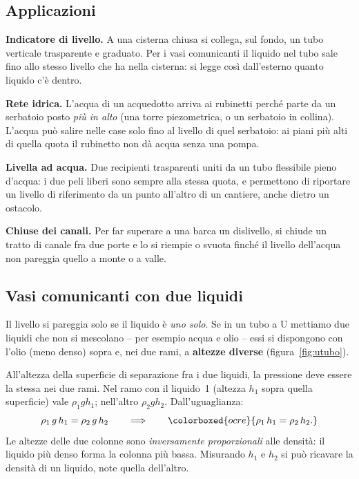 \subsection{Applicazioni}
\begin{elenco}
    \item \textbf{Indicatore di livello.} A una cisterna chiusa si collega, sul fondo, un tubo verticale trasparente e graduato. Per i vasi comunicanti il liquido nel tubo sale fino allo stesso livello che ha nella cisterna: si legge così dall'esterno quanto liquido c'è dentro.
    \item \textbf{Rete idrica.} L'acqua di un acquedotto arriva ai rubinetti perché parte da un serbatoio posto \emph{più in alto} (una torre piezometrica, o un serbatoio in collina). L'acqua può salire nelle case solo fino al livello di quel serbatoio: ai piani più alti di quella quota il rubinetto non dà acqua senza una pompa.
    \item \textbf{Livella ad acqua.} Due recipienti trasparenti uniti da un tubo flessibile pieno d'acqua: i due peli liberi sono sempre alla stessa quota, e permettono di riportare un livello di riferimento da un punto all'altro di un cantiere, anche dietro un ostacolo.
    \item \textbf{Chiuse dei canali.} Per far superare a una barca un dislivello, si chiude un tratto di canale fra due porte e lo si riempie o svuota finché il livello dell'acqua non pareggia quello a monte o a valle.
\end{elenco}

\subsection{Vasi comunicanti con due liquidi}
Il livello si pareggia solo se il liquido è \emph{uno solo}. Se in un tubo a U mettiamo due liquidi che non si mescolano -- per esempio acqua e olio -- essi si dispongono con l'olio (meno denso) sopra e, nei due rami, a \textbf{altezze diverse} (figura~\ref{fig:utubo}).

All'altezza della superficie di separazione fra i due liquidi, la pressione deve essere la stessa nei due rami. Nel ramo con il liquido~1 (altezza $h_1$ sopra quella superficie) vale $\rho_1 g h_1$; nell'altro $\rho_2 g h_2$. Dall'uguaglianza:
\[ \rho_1\,g\,h_1 = \rho_2\,g\,h_2 \qquad\Longrightarrow\qquad \colorboxed{ocre}{ \rho_1\,h_1 = \rho_2\,h_2. } \]
Le altezze delle due colonne sono \emph{inversamente proporzionali} alle densità: il liquido più denso forma la colonna più bassa. Misurando $h_1$ e $h_2$ si può ricavare la densità di un liquido, note quella dell'altro.

